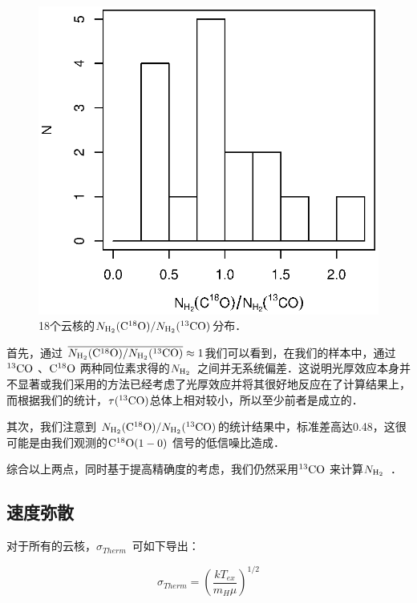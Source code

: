 \documentclass[UTF8, nocolorlinks]{pkuthss}
\newcommand{\cob}{$\rm ^{13}CO$ }
\newcommand{\coc}{$\rm C^{18}O$ }
\newcommand{\cocc}{$\rm C^{18}O(1-0)$ }
\newcommand{\nhyd}{$N_{\rm H_2}$\ }
\newcommand{\sigmath}{$\sigma _{Therm}$\ }
\begin{document}
			\begin{figure}[H]
				\centering
				\includegraphics[totalheight=70mm]{img_plot/1813.eps}
				\caption{\small 18个云核的${N_{\rm H_2}(\rm C^{18}O)}/{ N_{\rm H_2}(\rm ^{13}CO)}$分布．}
				\label{Fig.1813}
			\end{figure}

			首先，通过 $\overline{{N_{\rm H_2}(\rm C^{18}O)}/{N_{\rm H_2}(\rm ^{13}CO)}}\approx 1$我们可以看到，在我们的样本中，通过\cob、\coc 两种同位素求得的\nhyd 之间并无系统偏差．这说明光厚效应本身并不显著或我们采用的方法已经考虑了光厚效应并将其很好地反应在了计算结果上，而根据我们的统计，$\tau(^{13}\rm CO)$总体上相对较小，所以至少前者是成立的．

			其次，我们注意到 ${N_{\rm H_2}(\rm C^{18}O)}/{ N_{\rm H_2}(\rm ^{13}CO)}$的统计结果中，标准差高达0.48，这很可能是由我们观测的\cocc 信号的低信噪比造成．

			综合以上两点，同时基于提高精确度的考虑，我们仍然采用\cob 来计算\nhyd．

		\subsection{速度弥散}\label{Sec.VelocityDispersion}

			对于所有的云核，\sigmath 可如下导出：

      		\begin{equation}
      		   \sigma_{Therm}=\left( \frac{kT_{ex}}{m_H \mu} \right)^{1/2}
      		\end{equation}
\end{document}
